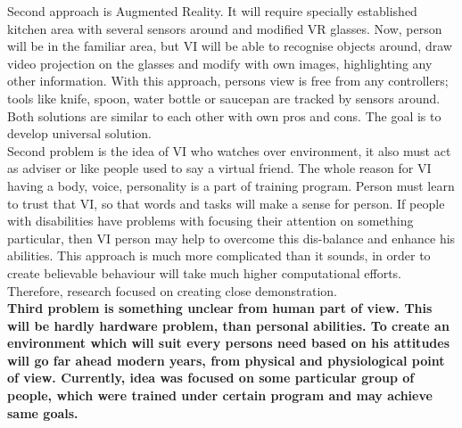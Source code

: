\documentclass[18pt]{article}
\numberwithin{equation}{section} %
\numberwithin{figure}{section} %
\numberwithin{table}{section} %
\begin{document}
		Second approach is Augmented Reality. It will require specially established kitchen area with several sensors around and modified VR glasses. Now, person will be in the familiar area, but VI will be able to recognise objects around, draw video projection on the glasses and modify with own images, highlighting any other information. With this approach, persons view is free from any controllers; tools like knife, spoon, water bottle or saucepan are tracked by sensors around.\\
		Both solutions are similar to each other with own pros and cons. The goal is to develop universal solution. \\
		
		Second problem is the idea of VI who watches over environment, it also must act as adviser or like people used to say a virtual friend. The whole reason for VI having a body, voice, personality is a part of training program. Person must learn to trust that VI, so that words and tasks will make a sense for person. If people with disabilities have problems with focusing their attention on something particular, then VI person may help to overcome this dis-balance and enhance his abilities. This approach is much more complicated than it sounds, in order to create believable behaviour will take much higher computational efforts. Therefore, research focused on creating close demonstration. \\
		
		\textbf{Third problem is something unclear from human part of view. This will be hardly hardware problem, than personal abilities. To create an environment which will suit every persons need based on his attitudes will go far ahead modern years, from physical and physiological point of view. Currently, idea was focused on some particular group of people, which were trained under certain program and may achieve same goals.} \\
	
\end{document}
